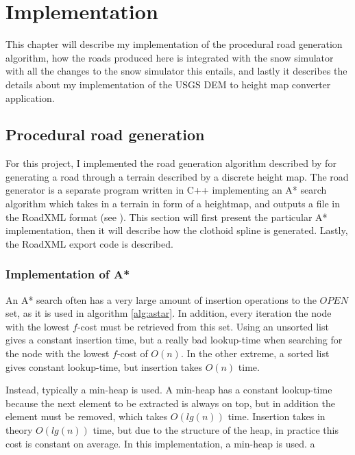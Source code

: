 \chapter{Implementation}
\label{chap:implementation}
This chapter will describe my implementation of the procedural road generation algorithm, how the roads produced here is integrated with the snow simulator with all the changes to the snow simulator this entails, and lastly it describes the details about my implementation of the USGS DEM to height map converter application.

\section{Procedural road generation}
For this project, I implemented the road generation algorithm described by \cite{roadgen} for generating a road through a terrain described by a discrete height map. The road generator is a separate program written in C++ implementing an A* search algorithm which takes in a terrain in form of a heightmap, and outputs a file in the RoadXML format (see \cite{roadxml}). This section will first present the particular A* implementation, then it will describe how the clothoid spline is generated. Lastly, the RoadXML export code is described.

\subsection{Implementation of A*}
An A* search often has a very large amount of insertion operations to the $OPEN$ set, as it is used in algorithm \ref{alg:astar}. In addition, every iteration the node with the lowest $f$-cost must be retrieved from this set. Using an unsorted list gives a constant insertion time, but a really bad lookup-time when searching for the node with the lowest $f$-cost of $O(n)$. In the other extreme, a sorted list gives constant lookup-time, but insertion takes $O(n)$ time. 

Instead, typically a min-heap is used. A min-heap has a constant lookup-time because the next element to be extracted is always on top, but in addition the element must be removed, which takes $O(lg(n))$ time. Insertion takes in theory $O(lg(n))$ time, but due to the structure of the heap, in practice this cost is constant on average. In this implementation, a min-heap is used. 
a

